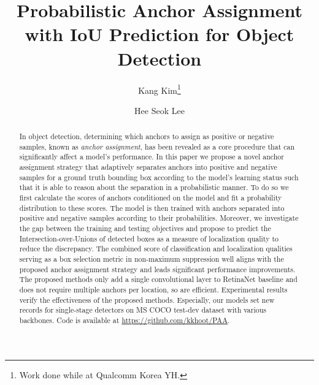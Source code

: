 \documentclass[runningheads]{llncs}
\begin{document}
\pagestyle{headings}
\mainmatter
\def\ECCVSubNumber{5041}  

\title{Probabilistic Anchor Assignment with IoU Prediction for Object Detection} \begin{comment}
\titlerunning{ECCV-20 submission ID \ECCVSubNumber} 
\authorrunning{ECCV-20 submission ID \ECCVSubNumber} 
\author{Anonymous ECCV submission}
\institute{Paper ID \ECCVSubNumber}
\end{comment}


\author{Kang Kim\thanks{Work done while at Qualcomm Korea YH.} \and
Hee Seok Lee}
\maketitle
\begin{abstract}
In object detection, determining which anchors to assign as positive or negative samples, known as \textit{anchor assignment}, has been revealed as a core procedure that can significantly affect a model's performance. In this paper we propose a novel anchor assignment strategy that adaptively separates anchors into positive and negative samples for a ground truth bounding box according to the model's learning status such that it is able to reason about the separation in a probabilistic manner. To do so we first calculate the scores of anchors conditioned on the model and fit a probability distribution to these scores. The model is then trained with anchors separated into positive and negative samples according to their probabilities. Moreover, we investigate the gap between the training and testing objectives and propose to predict the Intersection-over-Unions of detected boxes as a measure of localization quality to reduce the discrepancy.
The combined score of classification and localization qualities serving as a box selection metric in non-maximum suppression well aligns with the proposed anchor assignment strategy and leads significant performance improvements. The proposed methods only add a single convolutional layer to RetinaNet baseline and does not require multiple anchors per location, so are efficient. Experimental results verify the effectiveness of the proposed methods. Especially, our models set new records for single-stage detectors on MS COCO test-dev dataset with various backbones. Code is available at \url{https://github.com/kkhoot/PAA}.

\end{abstract}
\end{document}

